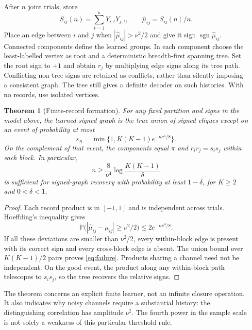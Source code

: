 \documentclass[11pt]{article}
\newtheorem{theorem}{Theorem}[section]
\theoremstyle{definition}
\theoremstyle{remark}
\newcommand{\Prb}{\mathbb P}
\newcommand{\sgn}{\operatorname{sgn}}
\begin{document}
After $n$ joint trials, store
\begin{equation}
 S_{ij}(n)=\sum_{t=1}^nY_{i,t}Y_{j,t},\qquad
 \widehat\mu_{ij}=S_{ij}(n)/n.
\end{equation}
Place an edge between $i$ and $j$ when $|\widehat\mu_{ij}|>\nu^2/2$ and give it sign $\sgn\widehat\mu_{ij}$. Connected components define the learned groups. In each component choose the least-labelled vertex as root and a deterministic breadth-first spanning tree. Set the root sign to $+1$ and obtain $r_j$ by multiplying edge signs along its tree path. Conflicting non-tree signs are retained as conflicts, rather than silently imposing a consistent graph. The tree still gives a definite decoder on such histories. With no records, use isolated vertices.

\begin{theorem}[Finite-record formation]
\label{thm:formation}
For any fixed partition and signs in the model above, the learned signed graph is the true union of signed cliques except on an event of probability at most
\begin{equation}
 \varepsilon_n=\min\{1,K(K-1)e^{-n\nu^4/8}\}.
 \label{eq:failure}
\end{equation}
On the complement of that event, the components equal $\pi$ and $r_ir_j=s_is_j$ within each block. In particular,
\begin{equation}
 n\ge\frac{8}{\nu^4}\log\frac{K(K-1)}{\delta}
\end{equation}
is sufficient for signed-graph recovery with probability at least $1-\delta$, for $K\ge2$ and $0<\delta<1$.
\end{theorem}
\begin{proof}
Each record product is in $[-1,1]$ and is independent across trials. Hoeffding's inequality \cite{Hoeffding1963} gives
\begin{equation}
 \Prb\bigl(|\widehat\mu_{ij}-\mu_{ij}|\ge\nu^2/2\bigr)
 \le2e^{-n\nu^4/8}.
\end{equation}
If all these deviations are smaller than $\nu^2/2$, every within-block edge is present with its correct sign and every cross-block edge is absent. The union bound over $K(K-1)/2$ pairs proves \eqref{eq:failure}. Products sharing a channel need not be independent. On the good event, the product along any within-block path telescopes to $s_is_j$, so the tree recovers the relative signs.
\end{proof}

The theorem concerns an explicit finite learner, not an infinite closure operation. It also indicates why noisy channels require a substantial history: the distinguishing correlation has amplitude $\nu^2$. The fourth power in the sample scale is not solely a weakness of this particular threshold rule.
\end{document}
